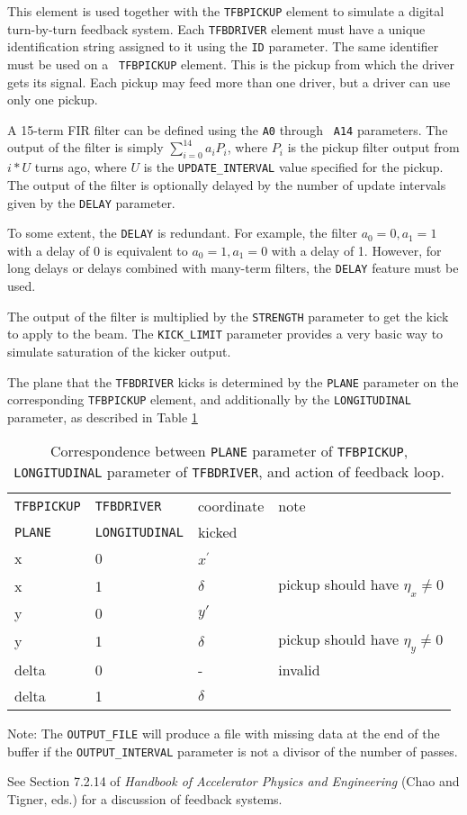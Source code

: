 This element is used together with the {\tt TFBPICKUP} element to
simulate a digital turn-by-turn feedback system.  Each {\tt TFBDRIVER}
element must have a unique identification string assigned to it using
the {\tt ID} parameter.  The same identifier must be used on a {\tt
TFBPICKUP} element.  This is the pickup from which the driver gets its
signal.  Each pickup may feed more than one driver, but a driver can
use only one pickup.

A 15-term FIR filter can be defined using the {\tt A0} through {\tt
A14} parameters.  The output of the filter is simply $\sum_{i=0}^{14}
a_i P_i$, where $P_i$ is the pickup filter output from $i*U$ turns ago,
where $U$ is the \verb|UPDATE_INTERVAL| value specified for the pickup.
The output of the filter is optionally delayed by the number of update intervals
given by the {\tt DELAY} parameter.

To some extent, the {\tt DELAY} is redundant.  For example, the filter
$a_0=0, a_1=1$ with a delay of 0 is equivalent to $a_0=1, a_1=0$ with
a delay of 1.  However, for long delays or delays combined with
many-term filters, the {\tt DELAY} feature must be used.

The output of the filter is multiplied by the {\tt STRENGTH} parameter
to get the kick to apply to the beam.  The {\tt KICK\_LIMIT} parameter
provides a very basic way to simulate saturation of the kicker output.

The plane that the \verb|TFBDRIVER| kicks is determined by the 
\verb|PLANE| parameter on the corresponding \verb|TFBPICKUP| element, and
additionally by the \verb|LONGITUDINAL| parameter, as described in 
Table \ref{tab:tfbdriver}

\begin{table}[htb]
\begin{tabular}{llll}
\hline
\verb|TFBPICKUP| & \verb|TFBDRIVER| & coordinate & note \\
\verb|PLANE| & \verb|LONGITUDINAL| & kicked & \\
\hline
x & 0 & $x^\prime$ & \\
x & 1 & $\delta$ & pickup should have $\eta_x\neq 0$ \\
y & 0 & $y\prime$ & \\
y & 1 & $\delta$ & pickup should have $\eta_y\neq 0$ \\
delta & 0 & - & invalid \\
delta & 1 & $\delta$ & \\
\hline
\end{tabular}
\caption{Correspondence between {\tt PLANE} parameter of {\tt TFBPICKUP}, {\tt LONGITUDINAL} parameter of {\tt TFBDRIVER}, and action of feedback loop.}
\label{tab:tfbdriver}
\end{table}

Note: The \verb|OUTPUT_FILE| will produce a file with missing data at the end of
the buffer if the \verb|OUTPUT_INTERVAL| parameter is not a divisor of the number of passes.

See Section 7.2.14 of {\em Handbook of Accelerator Physics and Engineering}
(Chao and Tigner, eds.) for a discussion of feedback systems.
